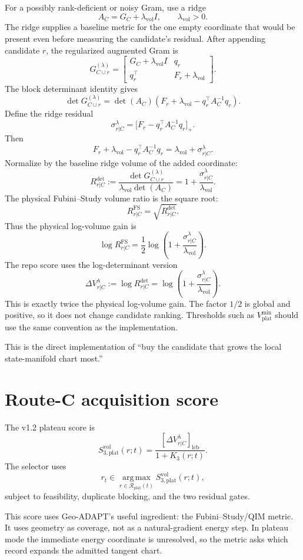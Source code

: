 \documentclass[10pt,twocolumn]{article}
\newcommand{\argmax}{\operatorname*{arg\,max}}
\newcommand{\lcb}{\mathrm{lcb}}
\newcommand{\plat}{\mathrm{plat}}
\newcommand{\vol}{\mathrm{vol}}
\newcommand{\FS}{\mathrm{FS}}
\begin{document}
For a possibly rank-deficient or noisy Gram, use a ridge
\[
A_C=G_C+\lambda_{\vol}I,
\qquad \lambda_{\vol}>0.
\]
The ridge supplies a baseline metric for the one empty coordinate that would be
present even before measuring the candidate's residual. After appending
candidate $r$, the regularized augmented Gram is
\[
G_{C\cup r}^{(\lambda)}=
\begin{bmatrix}
G_C+\lambda_{\vol}I & q_r\\
q_r^\top & F_r+\lambda_{\vol}
\end{bmatrix}.
\]
The block determinant identity gives
\[
\det G_{C\cup r}^{(\lambda)}
=\det(A_C)
\left(F_r+\lambda_{\vol}-q_r^\top A_C^{-1}q_r\right).
\]
Define the ridge residual
\[
\sigma_{r|C}^{\lambda}=\bigl[F_r-q_r^\top A_C^{-1}q_r\bigr]_+.
\]
Then
\[
F_r+\lambda_{\vol}-q_r^\top A_C^{-1}q_r
=\lambda_{\vol}+\sigma_{r|C}^{\lambda}.
\]
Normalize by the baseline ridge volume of the added coordinate:
\[
R_{r|C}^{\det}
:=
\frac{\det G_{C\cup r}^{(\lambda)}}
{\lambda_{\vol}\det(A_C)}
=1+\frac{\sigma_{r|C}^{\lambda}}{\lambda_{\vol}}.
\]
The physical Fubini--Study volume ratio is the square root:
\[
R_{r|C}^{\FS}=\sqrt{R_{r|C}^{\det}}.
\]
Thus the physical log-volume gain is
\[
\log R_{r|C}^{\FS}
=\frac12\log\left(1+\frac{\sigma_{r|C}^{\lambda}}{\lambda_{\vol}}\right).
\]
The repo score uses the log-determinant version
\[
\Delta V_{r|C}^{\lambda}
:=
\log R_{r|C}^{\det}
=
\log\left(1+\frac{\sigma_{r|C}^{\lambda}}{\lambda_{\vol}}\right).
\]
This is exactly twice the physical log-volume gain. The factor $1/2$ is global
and positive, so it does not change candidate ranking. Thresholds such as
$V_{\plat}^{\min}$ should use the same convention as the implementation.

This is the direct implementation of ``buy the candidate that grows the local
state-manifold chart most.''

\section{Route-C acquisition score}

The v1.2 plateau score is
\[
S_{3,\plat}^{\vol}(r;t)=
\frac{[\Delta V_{r|C}^{\lambda}]_{\lcb}}{1+K_3(r;t)}.
\]
The selector uses
\[
r_t\in\argmax_{r\in\mathcal R_{\plat}(t)}
S_{3,\plat}^{\vol}(r;t),
\]
subject to feasibility, duplicate blocking, and the two residual gates.

This score uses Geo-ADAPT's useful ingredient: the Fubini--Study/QIM metric. It
uses geometry as coverage, not as a natural-gradient energy step. In plateau
mode the immediate energy coordinate is unresolved, so the metric asks which
record expands the admitted tangent chart.
\end{document}
